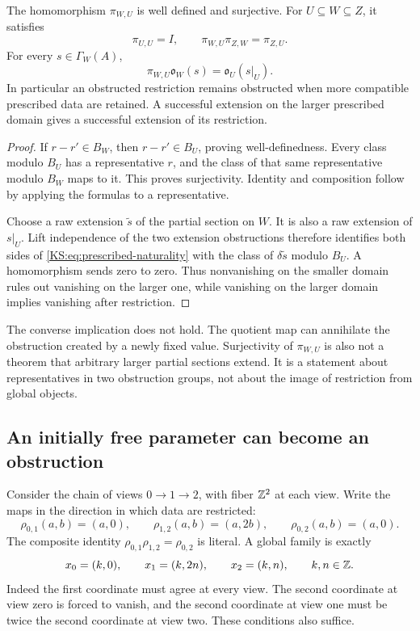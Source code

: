 \begin{KStheorem}\label{KS:KS59}
The homomorphism \(\pi_{W,U}\) is well defined and surjective. For \(U\subseteq W\subseteq Z\), it satisfies
\[
 \pi_{U,U}=I,\qquad \pi_{W,U}\pi_{Z,W}=\pi_{Z,U}.
\]
For every \(s\in\Gamma_W(A)\),
\begin{equation}\label{KS:eq:prescribed-naturality}
 \pi_{W,U}\mathfrak o_W(s)=\mathfrak o_U(s|_U).
\end{equation}
In particular an obstructed restriction remains obstructed when more compatible prescribed data are retained. A successful extension on the larger prescribed domain gives a successful extension of its restriction.
\end{KStheorem}
\begin{proof}
If \(r-r'\in B_W\), then \(r-r'\in B_U\), proving well-definedness. Every class modulo \(B_U\) has a representative \(r\), and the class of that same representative modulo \(B_W\) maps to it. This proves surjectivity. Identity and composition follow by applying the formulas to a representative.

Choose a raw extension \(\widetilde s\) of the partial section on \(W\). It is also a raw extension of \(s|_U\). Lift independence of the two extension obstructions therefore identifies both sides of \eqref{KS:eq:prescribed-naturality} with the class of \(\delta\widetilde s\) modulo \(B_U\). A homomorphism sends zero to zero. Thus nonvanishing on the smaller domain rules out vanishing on the larger one, while vanishing on the larger domain implies vanishing after restriction.
\end{proof}
The converse implication does not hold. The quotient map can annihilate the obstruction created by a newly fixed value. Surjectivity of \(\pi_{W,U}\) is also not a theorem that arbitrary larger partial sections extend. It is a statement about representatives in two obstruction groups, not about the image of restriction from global objects.

\subsection{An initially free parameter can become an obstruction}
Consider the chain of views \(0\to1\to2\), with fiber \(\mathbb Z^2\) at each view. Write the maps in the direction in which data are restricted:
\[
 \rho_{0,1}(a,b)=(a,0),\qquad
 \rho_{1,2}(a,b)=(a,2b),\qquad
 \rho_{0,2}(a,b)=(a,0).
\]
The composite identity \(\rho_{0,1}\rho_{1,2}=\rho_{0,2}\) is literal. A global family is exactly
\begin{equation}\label{KS:eq:branch-family}
 x_0=(k,0),\qquad x_1=(k,2n),\qquad x_2=(k,n),
 \qquad k,n\in\mathbb Z.
\end{equation}
Indeed the first coordinate must agree at every view. The second coordinate at view zero is forced to vanish, and the second coordinate at view one must be twice the second coordinate at view two. These conditions also suffice.

